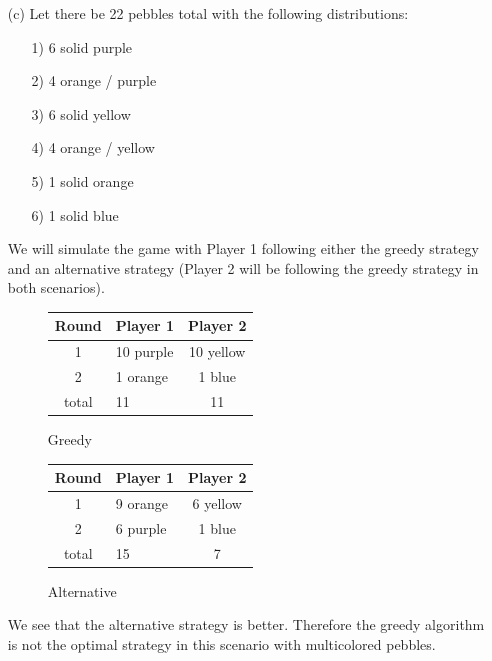 \documentclass[12pt]{article}
\begin{document}
\begin{enumerate}
\begin{proof}
  Assume $j$ is even:
   \begin{align}
    \Delta P &= (M_k + M_{k+2} + M_{k+4}, \dots, M_{j}) - (M_j + M_{k+1} + M_{k+3}, \dots, M_{j-1}) \\
    \Delta P &= (M_k + M_{k+2} + M_{k+4}, \dots, M_{j}) - (M_{k+1} + M_{k+3}, \dots, M_{j-1} + M_j)
  \end{align}
  $\Delta P \geq 0$. We can match each $M_i$ with $- M_{i+1}$ which is by definition smaller.

  Therefore, the change in pebbles by taking the maximum is as good as or better than any other strategy. We can extend this argument to previous turns where either player deviates. 
\end{proof}

\item[(c)] Let there be 22 pebbles total with the following distributions: 
  \begin{enumerate}
    \item[1)] 6 solid purple
    \item[2)] 4 orange / purple
    \item[3)] 6 solid yellow
    \item[4)] 4 orange / yellow
    \item[5)] 1 solid orange
    \item[6)] 1 solid blue
  \end{enumerate}

  We will simulate the game with Player 1 following either the greedy strategy and an alternative strategy (Player 2 will be following the greedy strategy in both scenarios).
\begin{figure}[H]
\centering
\caption{Greedy}
\begin{tabular}{c l c}
\toprule
Round & Player 1 & Player 2 \\
\midrule
1 & 10 purple & 10 yellow \\
2 & 1 orange & 1 blue \\
total & 11 & 11 \\
\bottomrule
\end{tabular}
\end{figure}

\begin{figure}[H]
\centering
\caption{Alternative}
\begin{tabular}{c l c}
\toprule
Round & Player 1 & Player 2 \\
\midrule
1 & 9 orange & 6 yellow \\
2 & 6 purple & 1 blue \\
total & 15 & 7 \\
\bottomrule
\end{tabular}
\end{figure}

We see that the alternative strategy is better. Therefore the greedy algorithm is not the optimal strategy in this scenario with multicolored pebbles.
\end{enumerate}
\end{document}
